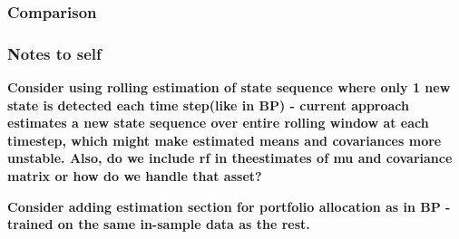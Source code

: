 
\subsubsection{Comparison}



\subsubsection{Notes to self}


\textbf{Consider using rolling estimation of state sequence where only 1 new state is detected each time step(like in BP) - current approach estimates a new state sequence over entire rolling window at each timestep, which might make estimated means and covariances more unstable. Also, do we include rf in theestimates of mu and covariance matrix or how do we handle that asset?}

\textbf{Consider adding estimation section for portfolio allocation as in BP - trained on the same in-sample data as the rest.}